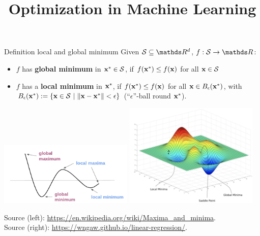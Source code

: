 \documentclass[11pt,compress,t,notes=noshow, xcolor=table]{beamer}
\title{Optimization in Machine Learning}
\date{}
\begin{document}
\sloppy

\begin{vbframe}{Definition local and global minimum}
  Given $\mathcal{S} \subseteq \R^d$, $f: \mathcal{S} \to \R$:
  \begin{itemize}
  \item $f$ has \textbf{global minimum} in $\mathbf{x}^\ast \in \mathcal{S}$, if $f(\mathbf{x}^\ast) \leq f(\mathbf{x})$ for all $\mathbf{x} \in \mathcal{S}$
  \item $f$ has a \textbf{local minimum} in $\mathbf{x}^\ast$, if $f(\mathbf{x}^\ast) \leq f(\mathbf{x})$ for all $\mathbf{x} \in B_\epsilon(\mathbf{x}^\ast)$, with $B_\epsilon(\mathbf{x}^\ast) := \{\mathbf{x} \in \mathcal{S} ~|~\|\mathbf{x} - \mathbf{x}^\ast\| < \epsilon\}$ (\enquote{$\epsilon$}-ball round $\mathbf{x}^\ast$).  
  \end{itemize}
  
  \vspace*{-0.3cm}
  
  \begin{center}
  \includegraphics[width = 0.48\textwidth]{figure_man/local_global_min.png} \quad \includegraphics[width = 0.48\textwidth]{figure_man/local_global_min_2D.png} \\
  \vspace*{0.3cm}
  \begin{tiny}
    Source (left): \url{https://en.wikipedia.org/wiki/Maxima_and_minima}. \\ Source (right): \url{https://wngaw.github.io/linear-regression/}. 
  \end{tiny}
  \end{center}
  
  \end{vbframe}
  
\end{document}
